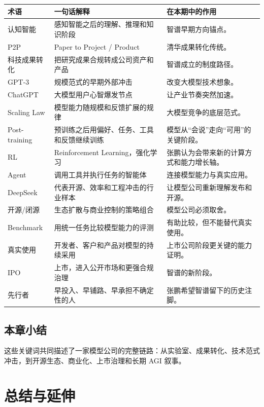 \documentclass[a4paper]{article}
\begin{document}
\begin{longtable}{p{}p{}p{}}
\toprule
术语 & 一句话解释 & 在本期中的作用 \\
\midrule
认知智能 & 感知智能之后的理解、推理和知识阶段 & 智谱早期方向锚点。 \\
P2P & Paper to Project / Product & 清华成果转化传统。 \\
科技成果转化 & 把研究成果合规转成公司资产和产品 & 智谱成立的制度路径。 \\
GPT-3 & 规模范式的早期外部冲击 & 改变大模型技术想象。 \\
ChatGPT & 大模型用户心智爆发节点 & 让产业节奏突然加速。 \\
Scaling Law & 模型能力随规模和反馈扩展的规律 & 大模型竞争的底层范式。 \\
Post-training & 预训练之后用偏好、任务、工具和反馈继续训练 & 模型从“会说”走向“可用”的关键阶段。 \\
RL & Reinforcement Learning，强化学习 & 张鹏认为会带来新的计算方式和能力增长轴。 \\
Agent & 调用工具并执行任务的智能体 & 连接模型能力与真实应用。 \\
DeepSeek & 代表开源、效率和工程冲击的行业样本 & 让模型公司重新理解发布和开源。 \\
开源/闭源 & 生态扩散与商业控制的策略组合 & 模型公司必须取舍。 \\
Benchmark & 用统一任务比较模型能力的评测 & 有助比较，但不能替代真实使用。 \\
真实使用 & 开发者、客户和产品对模型的持续采用 & 上市公司阶段更关键的能力证明。 \\
IPO & 上市，进入公开市场和更强合规治理 & 智谱的新阶段。 \\
先行者 & 早投入、早铺路、早承担不确定性的人 & 张鹏希望智谱留下的历史注脚。 \\
\bottomrule
\end{longtable}

\subsection{本章小结}

这些关键词共同描述了一家模型公司的完整链路：从实验室、成果转化、技术范式冲击，到开源生态、商业化、上市治理和长期 AGI 叙事。

\section{总结与延伸}
\end{document}
